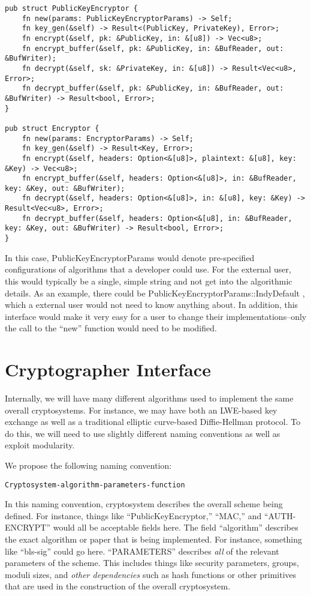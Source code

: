 \documentclass[letterpaper,11pt]{article}
\begin{document}
\begin{verbatim}
pub struct PublicKeyEncryptor {
    fn new(params: PublicKeyEncryptorParams) -> Self;
    fn key_gen(&self) -> Result<(PublicKey, PrivateKey), Error>;
    fn encrypt(&self, pk: &PublicKey, in: &[u8]) -> Vec<u8>;
    fn encrypt_buffer(&self, pk: &PublicKey, in: &BufReader, out: &BufWriter);
    fn decrypt(&self, sk: &PrivateKey, in: &[u8]) -> Result<Vec<u8>, Error>;
    fn decrypt_buffer(&self, pk: &PublicKey, in: &BufReader, out: &BufWriter) -> Result<bool, Error>;
}

pub struct Encryptor {
    fn new(params: EncryptorParams) -> Self;
    fn key_gen(&self) -> Result<Key, Error>;
    fn encrypt(&self, headers: Option<&[u8]>, plaintext: &[u8], key: &Key) -> Vec<u8>;
    fn encrypt_buffer(&self, headers: Option<&[u8]>, in: &BufReader, key: &Key, out: &BufWriter);
    fn decrypt(&self, headers: Option<&[u8]>, in: &[u8], key: &Key) -> Result<Vec<u8>, Error>;
    fn decrypt_buffer(&self, headers: Option<&[u8], in: &BufReader, key: &Key, out: &BufWriter) -> Result<bool, Error>;
}
\end{verbatim}

In this case, PublicKeyEncryptorParams would denote pre-specified configurations of algorithms that a developer could use.  For the external user, this would typically be a single, simple string and not get into the algorithmic details.  As an example, there could be PublicKeyEncryptorParams::IndyDefault , which a external user would not need to know anything about.  In addition, this interface would make it very easy for a user to change their implementations--only the call to the ``new'' function would need to be modified.


\section{Cryptographer Interface}
Internally, we will have many different algorithms used to implement the same overall cryptosystems.  For instance, we may have both an LWE-based key exchange as well as a traditional elliptic curve-based Diffie-Hellman protocol.  To do this, we will need to use slightly different naming conventions as well as exploit modularity.

We propose the following naming convention:
\begin{verbatim}
Cryptosystem-algorithm-parameters-function
\end{verbatim}

In this naming convention, cryptosystem describes the overall scheme being defined.  For instance, things like ``PublicKeyEncryptor,'' ``MAC,'' and ``AUTH-ENCRYPT'' would all be acceptable fields here.  The field ``algorithm'' describes the exact algorithm or paper that is being implemented.  For instance, something like ``bls-sig'' could go here.  ``PARAMETERS'' describes \emph{all} of the relevant parameters of the scheme.  This includes things like security parameters, groups, moduli sizes, and \emph{other dependencies} such as hash functions or other primitives that are used in the construction of the overall cryptosystem.
\end{document}
